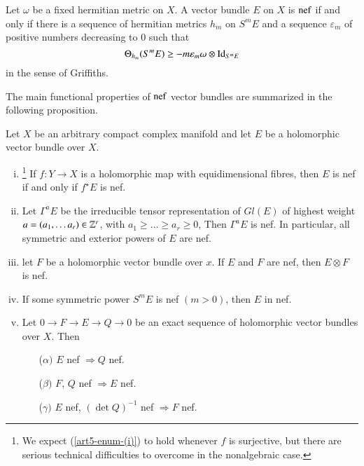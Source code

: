 \begin{criterion}\label{art5-definition-1.5}
Let $\omega$ be a fixed hermitian metric on $X$. A vector bundle $E$ on $X$ is $\operatorname{nef}$ if and only if there is a sequence of hermitian metrics $h_{m}$ on $S^{m}E$ and a sequence $\varepsilon_{m}$ of positive numbers decreasing to 0 such that
$$
\Theta_{h_{m}}(S^{m} E) \geq -m\varepsilon_{m}\omega\otimes \operatorname{Id}_{S^{m} E}
$$
in the sense of Griffiths.

The main functional properties of $\operatorname{nef}$ vector bundles are summarized in the following proposition.
\end{criterion}

\begin{prop}\label{art5-prop-1.6}
Let $X$ be an arbitrary compact complex manifold and let $E$ be a  holomorphic vector bundle over $X$.
\begin{enumerate}[(i)]
\item \footnote{We expect (\ref{art5-enum-(i)}) to hold whenever $f$ is surjective, but there are serious technical difficulties to overcome in the nonalgebraic case.} If $f: Y\rightarrow X$ is a holomorphic map with equidimensional fibres, then $E$ is nef if and only if $f^{\star}E$ is nef.\label{art5-enum-(i)}
\item Let $\Gamma^{a}E$ be the irreducible tensor representation of $Gl(E)$ of highest weight $a= (a_{1}, \ldots a_{r}) \in \mathbb{Z}^{r}$, with $a_{1}\geq\ldots\geq a_{r} \geq 0$, Then $\Gamma^{a}E$ is nef. In particular, all symmetric and exterior powers of $E$ are nef.\label{art5-enum-(ii)}
\item let $F$ be a holomorphic vector bundle over $x$. If $E$ and $F$ are nef, then $E\otimes F$ is nef.\label{art5-enum-(iii)}

\item If some symmetric power $S^{m}E$ is nef $(m > 0)$, then $E$ in nef. \label{art5-enum-(iv)}

\item Let $0 \rightarrow F \rightarrow E \rightarrow Q \rightarrow 0$ be an exact sequence of holomorphic vector bundles over $X$. Then\label{art5-enum-(v)}
    \begin{enumerate}
        \item[($\alpha)$] $E$ nef $\Rightarrow Q$ nef.
        \item [($\beta)$] $F$, $Q$ nef $\Rightarrow E$ nef.
        \item [($\gamma)$] $E$ nef, $(\det Q)^{-1}$ nef $\Rightarrow F$ nef.
    \end{enumerate}
\end{enumerate}
\end{prop}

